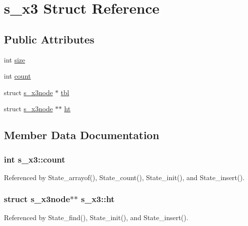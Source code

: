 \hypertarget{structs__x3}{\section{s\-\_\-x3 Struct Reference}
\label{structs__x3}
}
\subsection*{Public Attributes}
\begin{DoxyCompactItemize}
\item 
int \hyperlink{structs__x3_af02ce4fa00cf802a36e08ef94bd9e3e7}{size}
\item 
int \hyperlink{structs__x3_afe7cafeeae290d801ec8fbe16283e443}{count}
\item 
struct \hyperlink{structs__x3node}{s\-\_\-x3node} $\ast$ \hyperlink{structs__x3_a6988945c2b9d596fa41ce10a3f3e1b59}{tbl}
\item 
struct \hyperlink{structs__x3node}{s\-\_\-x3node} $\ast$$\ast$ \hyperlink{structs__x3_adc835a7bd2e097aaee0b0431fa7612d6}{ht}
\end{DoxyCompactItemize}


\subsection{Member Data Documentation}
\hypertarget{structs__x3_afe7cafeeae290d801ec8fbe16283e443}{
\subsubsection[{count}]{\setlength{\rightskip}{0pt plus 5cm}int s\-\_\-x3\-::count}}\label{structs__x3_afe7cafeeae290d801ec8fbe16283e443}


Referenced by State\-\_\-arrayof(), State\-\_\-count(), State\-\_\-init(), and State\-\_\-insert().

\hypertarget{structs__x3_adc835a7bd2e097aaee0b0431fa7612d6}{
\subsubsection[{ht}]{\setlength{\rightskip}{0pt plus 5cm}struct {\bf s\-\_\-x3node}$\ast$$\ast$ s\-\_\-x3\-::ht}}\label{structs__x3_adc835a7bd2e097aaee0b0431fa7612d6}


Referenced by State\-\_\-find(), State\-\_\-init(), and State\-\_\-insert().

